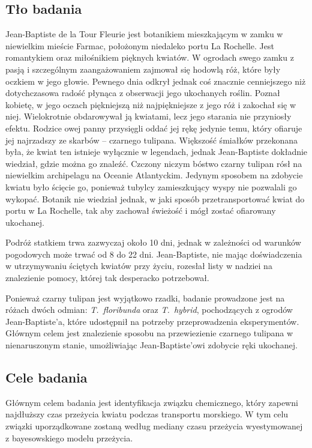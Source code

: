 \documentclass[12pt, a4paper]{article}
\begin{document}
\subsection{Tło badania}
Jean-Baptiste de la Tour Fleurie jest botanikiem mieszkającym w zamku w niewielkim mieście Farmac, położonym niedaleko portu La Rochelle. Jest romantykiem oraz miłośnikiem pięknych kwiatów. W ogrodach swego zamku z pasją i szczególnym zaangażowaniem zajmował się hodowlą róż, które były oczkiem w jego głowie. Pewnego dnia odkrył jednak coś znacznie cenniejszego niż dotychczasowa radość płynąca z obserwacji jego ukochanych roślin. Poznał kobietę, w jego oczach piękniejszą niż najpiękniejsze z jego róż i zakochał się w niej. Wielokrotnie obdarowywał ją kwiatami, lecz jego starania nie przyniosły efektu. Rodzice owej panny przysięgli oddać jej rękę jedynie temu, który ofiaruje jej najrzadszy ze skarbów -- czarnego tulipana. Większość śmiałków przekonana była, że kwiat ten istnieje wyłącznie w legendach, jednak Jean-Baptiste dokładnie wiedział, gdzie można go znaleźć. Czczony niczym bóstwo czarny tulipan rósł na niewielkim archipelagu na Oceanie Atlantyckim. Jedynym sposobem na zdobycie kwiatu było ścięcie go, ponieważ tubylcy zamieszkujący wyspy nie pozwalali go wykopać. Botanik nie wiedział jednak, w jaki sposób przetransportować kwiat do portu w La Rochelle, tak aby zachował świeżość i mógł zostać ofiarowany ukochanej.

\par Podróż statkiem trwa zazwyczaj około 10 dni, jednak w zależności od warunków pogodowych może trwać od 8 do 22 dni. Jean-Baptiste, nie mając doświadczenia w utrzymywaniu ściętych kwiatów przy życiu, rozesłał listy w nadziei na znalezienie pomocy, której tak desperacko potrzebował.
\par Ponieważ czarny tulipan jest wyjątkowo rzadki, badanie prowadzone jest na różach dwóch odmian: \textit{T.~floribunda} oraz \textit{T.~hybrid}, pochodzących z ogrodów Jean-Baptiste’a, które udostępnił na potrzeby przeprowadzenia eksperymentów. Głównym celem jest znalezienie sposobu na przewiezienie czarnego tulipana w nienaruszonym stanie, umożliwiając Jean-Baptiste’owi zdobycie ręki ukochanej.

\subsection{Cele badania}
Głównym celem badania jest identyfikacja związku chemicznego, który zapewni najdłuższy czas przeżycia kwiatu podczas transportu morskiego. W tym celu związki uporządkowane zostaną według mediany czasu przeżycia wyestymowanej z bayesowskiego modelu przeżycia.
\end{document}
